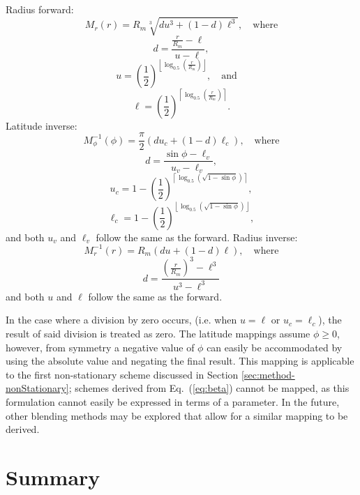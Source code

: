 %
%
Radius forward:
%
\begin{equation*}
M_{r}(r) = R_{m} \sqrt[3]{ d u^{3} + \left( 1 - d \right) \ell^{3} }, \quad \text{where}
\end{equation*}
%
\begin{equation*}
d = \frac{\frac{r}{R_{m}} - \ell}{u - \ell},
\end{equation*}
%
\begin{equation*}
u = \left( \frac{1}{2} \right)^{ \left\lfloor \log_{0.5} \left( \frac{r}{R_{m}} \right) \right\rfloor }, \quad \text{and} \quad
\end{equation*}
%
\begin{equation*}
\ell = \left( \frac{1}{2} \right)^{ \left\lceil \log_{0.5} \left( \frac{r}{R_{m}} \right) \right\rceil }.
\end{equation*}
%
%
Latitude inverse:
%
\begin{equation*}
M^{-1}_{\phi}(\phi) = \frac{\pi}{2} \left( d u_{c} + \left( 1 - d \right) \ell_{c} \right), \quad \text{where}
\end{equation*}
%
\begin{equation*}
d = \frac{\sin \phi - \ell_{v}}{u_{v} - \ell_{v}},
\end{equation*}
%
\begin{equation*}
u_{c} = 1 - \left( \frac{1}{2} \right)^{ \left\lceil \log_{0.5} \left( \sqrt{1 - \sin \phi} \right) \right\rceil },
\end{equation*}
%
\begin{equation*}
\ell_{c} = 1 - \left( \frac{1}{2} \right)^{ \left\lfloor \log_{0.5} \left( \sqrt{1 - \sin \phi} \right) \right\rfloor },
\end{equation*}
%
%
and both $u_{v}$ and $\ell_{v}$ follow the same as the forward.
Radius inverse:
%
\begin{equation*}
M^{-1}_{r}(r) = R_m \left( d u + \left( 1 - d \right) \ell \right), \quad \text{where}
\end{equation*}
%
\begin{equation*}
d = \frac{ \left( \frac{r}{R_{m}} \right)^{3} - \ell^{3}}{u^{3} - \ell^{3}}
\end{equation*}
%
and both $u$ and $\ell$ follow the same as the forward.


In the case where a division by zero occurs, (i.e. when $u = \ell$ or $u_{c} = \ell_{c}$), the result of said division is treated as zero.
The latitude mappings assume $\phi \ge 0$, however, from symmetry a negative value of $\phi$ can easily be accommodated by using the absolute value and negating the final result.
This mapping is applicable to the first non-stationary scheme discussed in Section \ref{sec:method-nonStationary}; schemes derived from Eq.~(\ref{eq:beta}) cannot be mapped, as this formulation cannot easily be expressed in terms of a parameter.
In the future, other blending methods may be explored that allow for a similar mapping to be derived.




\section{Summary}